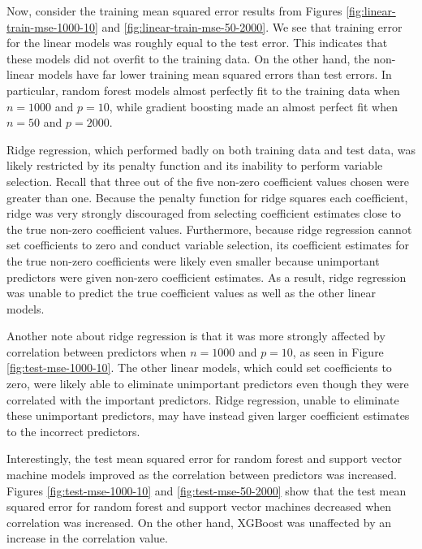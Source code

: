 \documentclass{article}
\begin{document}
	Now, consider the training mean squared error results from Figures \ref{fig:linear-train-mse-1000-10} and \ref{fig:linear-train-mse-50-2000}. We see that training error for the linear models was roughly equal to the test error. This indicates that these models did not overfit to the training data. On the other hand, the non-linear models have far lower training mean squared errors than test errors. In particular, random forest models almost perfectly fit to the training data when $n = 1000$ and $p = 10$, while gradient boosting made an almost perfect fit when $n = 50$ and $p = 2000$.
	
	Ridge regression, which performed badly on both training data and test data, was likely restricted by its penalty function and its inability to perform variable selection. Recall that three out of the five non-zero coefficient values chosen were greater than one. Because the penalty function for ridge squares each coefficient, ridge was very strongly discouraged from selecting coefficient estimates close to the true non-zero coefficient values. Furthermore, because ridge regression cannot set coefficients to zero and conduct variable selection, its coefficient estimates for the true non-zero coefficients were likely even smaller because unimportant predictors were given non-zero coefficient estimates. As a result, ridge regression was unable to predict the true coefficient values as well as the other linear models.
	
	Another note about ridge regression is that it was more strongly affected by correlation between predictors when $n = 1000$ and $p = 10$, as seen in Figure \ref{fig:test-mse-1000-10}. The other linear models, which could set coefficients to zero, were likely able to eliminate unimportant predictors even though they were correlated with the important predictors. Ridge regression, unable to eliminate these unimportant predictors, may have instead given larger coefficient estimates to the incorrect predictors.
	
	Interestingly, the test mean squared error for random forest and support vector machine models improved as the correlation between predictors was increased. Figures \ref{fig:test-mse-1000-10} and \ref{fig:test-mse-50-2000} show that the test mean squared error for random forest and support vector machines decreased when correlation was increased. On the other hand, XGBoost was unaffected by an increase in the correlation value.
	
\end{document}
